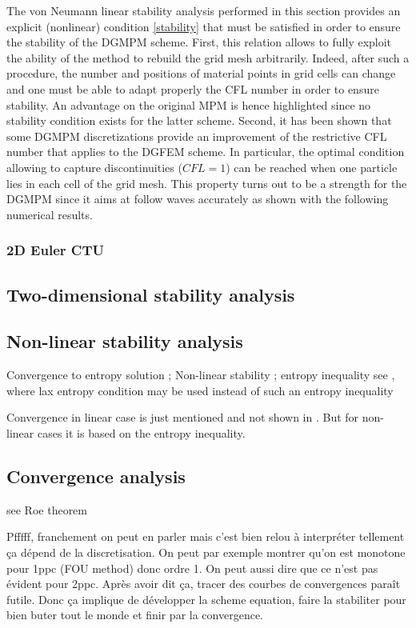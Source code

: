 The von Neumann linear stability analysis performed in this section provides an explicit (nonlinear) condition \eqref{stability} that must be satisfied in order to ensure the stability of the DGMPM scheme. First, this relation allows to fully exploit the ability of the method to rebuild the grid mesh arbitrarily. Indeed, after such a procedure, the number and positions of material points in grid cells can change and one must be able to adapt properly the CFL number in order to ensure stability. An advantage on the original MPM is hence highlighted since no stability condition exists for the latter scheme. Second, it has been shown that some DGMPM discretizations provide an improvement of the restrictive CFL number that applies to the DGFEM scheme. In particular, the optimal condition allowing to capture discontinuities ($CFL=1$) can be reached when one particle lies in each cell of the grid mesh. This property turns out to be a strength for the DGMPM since it aims at follow waves accurately as shown with the following numerical results.

\subsubsection*{2D Euler CTU}



\subsection{Two-dimensional stability analysis}


\subsection{Non-linear stability analysis}
Convergence to entropy solution ; Non-linear stability ; entropy inequality
see \cite[p.219]{Leveque}, where lax entropy condition may be used instead of such an entropy inequality

Convergence in linear case is just mentioned and not shown in \cite{Cockburn}. But for non-linear cases it is based on the entropy inequality.

\subsection{Convergence analysis}
see Roe theorem \cite[p.417]{Toro}


Pfffff, franchement on peut en parler mais c'est bien relou à interpréter tellement ça dépend de la discretisation. On peut par exemple montrer qu'on est monotone pour 1ppc (FOU method) donc ordre 1. On peut aussi dire que ce n'est pas évident pour 2ppc. Après avoir dit ça, tracer des courbes de convergences paraît futile. Donc ça implique de développer la scheme equation, faire la stabiliter pour bien buter tout le monde et finir par la convergence.

